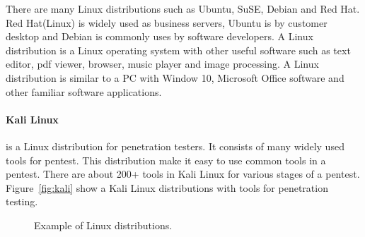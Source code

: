 \documentclass[7x9]{times}
\begin{document}
There are many Linux distributions such as Ubuntu, SuSE,
Debian and Red Hat. Red Hat(Linux) is widely used as
business servers, Ubuntu is by customer desktop and Debian
is commonly uses by software developers. A Linux
distribution is a Linux operating system with other useful
software such as text editor, pdf viewer, browser, music
player and image processing. A Linux distribution is similar
to a PC with Window 10, Microsoft Office software and other
familiar software applications.



\paragraph{Kali Linux}is a Linux distribution for
penetration testers. It consists of many widely used tools
for pentest. This distribution make it easy to use common
tools in a pentest. There are about 200+ tools in Kali Linux
for various stages of a pentest. Figure~\ref{fig:kali} show
a Kali Linux distributions with tools for penetration
testing.


\begin{figure}[!t]
\centering
{}
\hfil
{}
\caption{Example of Linux distributions.}
\label{fig:linux}
\end{figure}
\end{document}
